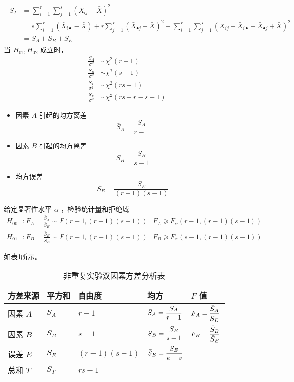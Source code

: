 \begin{align}
    \begin{split}
        S_T 
        & = \sum_{i=1}^{r} \sum_{j=1}^{s} \left(X_{ij} - \bar{X}\right)^2 \\ 
        & = s \sum_{i=1}^{r} (\bar{X}_{i•} - \bar{X}) + r \sum_{j=1}^{s}\left( \bar{X}_{• j} - \bar{X} \right)^2
          + \sum_{i=1}^{r} \sum_{j=1}^{s} \left( X_{ij} - \bar{X}_{i•} - \bar{X}_{• j} + \bar{X} \right)^2 \\
        & = S_A + S_B + S_E
    \end{split}
\end{align}
当 $ H_{01}, H_{02} $ 成立时，
\begin{align}
    \frac{S_A}{\sigma^2} & ∼ \chi^2(r-1) \\
    \frac{S_B}{\sigma^2} & ∼ \chi^2(s-1) \\
    \frac{S_T}{\sigma^2} & ∼ \chi^2(rs-1) \\
    \frac{S_E}{\sigma^2} & ∼ \chi^2(rs-r-s+1)
\end{align}

\begin{itemize}[leftmargin=\paritemindent]
    \item 因素 $ A $ 引起的均方离差 $$ \bar{S}_A = \frac{S_A}{r-1} $$
    \item 因素 $ B $ 引起的均方离差 $$ \bar{S}_B = \frac{S_B}{s-1} $$
    \item 均方误差 $$ \bar{S}_E = \frac{S_E}{(r-1)(s-1)} $$
\end{itemize}


 给定显著性水平 $ α $ ，检验统计量和拒绝域
\begin{align}
    H_{00} & : F_A = \frac{\bar{S}_A}{\bar{S}_E} ∼ F(r-1, (r-1)(s-1)) &
    F_A ⩾ F_\alpha(r-1, (r-1)(s-1)) \\
    H_{01} & : F_B = \frac{\bar{S}_B}{\bar{S}_E} ∼ F(r-1, (r-1)(s-1)) &
    F_B ⩾ F_\alpha(s-1, (r-1)(s-1))
\end{align}

 如表\ref{tab:非重复实验双因素方差分析表}所示。

\begin{table}[hbtp]
    \renewcommand{\arraystretch}{2}
    \centering
    \caption{非重复实验双因素方差分析表}
    \label{tab:非重复实验双因素方差分析表}
    \begin{tabular}{l|l|l|l|l} \hline
        方差来源   & 平方和  & 自由度         & 均方                            & $ F $ 值 \\\hline
        因素 $ A $ & $ S_A $ & $ r-1 $        & $ \displaystyle \bar{S}_A = \frac{S_A}{r-1} $ & $ \displaystyle F_A = \frac{\bar{S}_A}{\bar{S}_E} $ \\
        因素 $ B $ & $ S_B $ & $ s-1 $        & $ \displaystyle \bar{S}_B = \frac{S_B}{s-1} $ & $ \displaystyle F_B = \frac{\bar{S}_B}{\bar{S}_E} $ \\
        误差 $ E $ & $ S_E $ & $ (r-1)(s-1) $ & $ \displaystyle \bar{S}_E = \frac{S_E}{n-s} $ & \\
        总和 $ T $ & $ S_T $ & $ rs-1 $       & & \\\hline
    \end{tabular}
\end{table}


